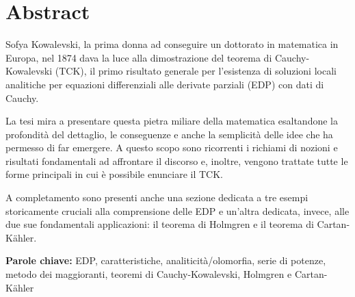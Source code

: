 \chapter*{Abstract}

Sofya Kowalevski, la prima donna ad conseguire un dottorato in matematica in Europa, nel 1874 dava la luce alla dimostrazione del teorema di Cauchy-Kowalevski (TCK), il primo risultato generale per l'esistenza di soluzioni locali analitiche per equazioni differenziali alle derivate parziali (EDP) con dati di Cauchy.

\vspace{6mm}
La tesi mira a presentare questa pietra miliare della matematica esaltandone la profondità del dettaglio, le conseguenze e anche la semplicità delle idee che ha permesso di far emergere. A questo scopo sono ricorrenti i richiami di nozioni e risultati fondamentali ad affrontare il discorso e, inoltre, vengono trattate tutte le forme principali in cui è possibile enunciare il TCK.

\vspace{6mm}
A completamento sono presenti anche una sezione dedicata a tre esempi storicamente cruciali alla comprensione delle EDP e un'altra dedicata, invece, alle due sue fondamentali applicazioni: il teorema di Holmgren e il teorema di Cartan-Kähler.

\vspace{6mm}
\textbf{Parole chiave:} EDP, caratteristiche, analiticità/olomorfia, serie di potenze, metodo dei maggioranti, teoremi di Cauchy-Kowalevski, Holmgren e Cartan-Kähler

\newpage
\blankpage